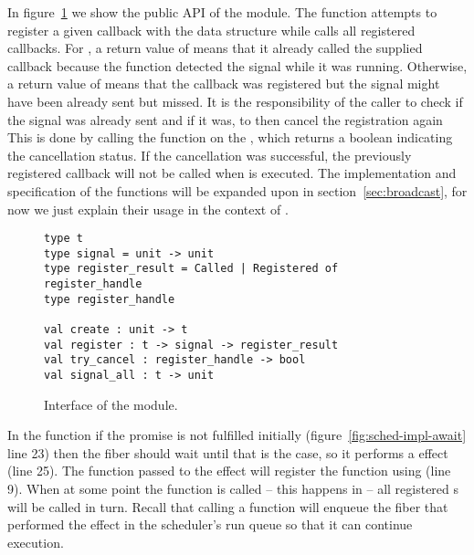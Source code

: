 In figure~\ref{fig:sched-impl-broadcast} we show the public API of the  module.
The  function attempts to register a given callback with the data structure while  calls all registered callbacks.
For , a return value of  means that it already called the supplied callback because the function detected the signal while it was running.
Otherwise, a return value of  means that the callback was registered but the signal might have been already sent but missed.
It is the responsibility of the caller to check if the signal was already sent and if it was, to then cancel the registration again
This is done by calling the  function on the , which returns a boolean indicating the cancellation status.
If the cancellation was successful, the previously registered callback will not be called when  is executed.
The implementation and specification of the functions will be expanded upon in section~\ref{sec:broadcast}, for now we just explain their usage in the context of .

\begin{figure}[ht]
  \begin{verbatim}
type t
type signal = unit -> unit
type register_result = Called | Registered of register_handle
type register_handle

val create : unit -> t
val register : t -> signal -> register_result
val try_cancel : register_handle -> bool
val signal_all : t -> unit
  \end{verbatim}
  \caption{Interface of the  module.}
  \label{fig:sched-impl-broadcast}
\end{figure}

In the  function if the promise is not fulfilled initially (figure~\ref{fig:sched-impl-await} line 23) then the fiber should wait until that is the case, so it performs a \esuspend{} effect (line 25).
The  function passed to the effect will register the  function using  (line 9).
When at some point the  function is called -- this happens in  -- all registered s will be called in turn.
Recall that calling a  function will enqueue the fiber that performed the \esuspend{} effect in the scheduler's run queue so that it can continue execution.

